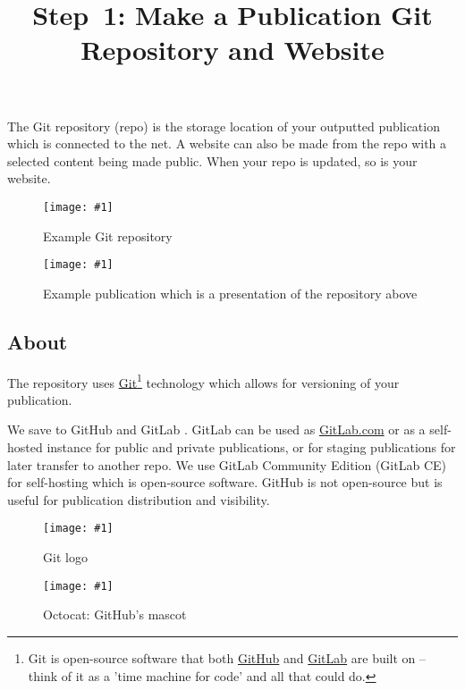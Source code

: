 \documentclass{article}
\newlength{\imgwidth}
\newcommand\scaledgraphics[2]{%
                
\settowidth{\imgwidth}{\texttt{[image: \#1]}}%
                
\setlength{\imgwidth}{\minof{\imgwidth}{#2\textwidth}}%
                
\texttt{[image: \#1]}%
                
}
\begin{document}
\title{Step 1: Make a Publication Git Repository and Website}

\maketitle


The Git repository (repo) is the storage location of your outputted publication which is connected to the net. A website can also be made from the repo with a selected content being made public. When your repo is updated, so is your website.

\begin{figure}
\scaledgraphics{f8bbd94d-f20e-4bbe-b9d3-9b043bedfdb7.png}{0.5}
\caption*{Example Git repository}\label{F55869431}
\end{figure}

\begin{figure}
\scaledgraphics{d7cbcac6-ef5e-484d-850a-d174a6888644.png}{0.5}
\caption*{Example publication which is a presentation of the repository above}\label{F88093361}
\end{figure}


\subsection{About}\label{H4018151}



The repository uses \href{https://git-scm.com/}{Git}\footnote{Git is open-source software that both \href{https://github.com/}{GitHub} and \href{https://about.gitlab.com/}{GitLab} are built on – think of it as a 'time machine for code' and all that could do.} technology which allows for versioning of your publication. 


We save to GitHub and GitLab \autocite{PerkelJeffrey2016}. GitLab can be used as \href{GitLab.com}{GitLab.com} or as a self-hosted instance for public and private publications, or for staging publications for later transfer to another repo. We use GitLab Community Edition (GitLab CE) for self-hosting which is open-source software. GitHub is not open-source but is useful for publication distribution and visibility.

\begin{figure}
\scaledgraphics{26972b81-3aa5-42db-9da6-7ab6ab269dc3.jpg}{0.5}
\caption*{Git logo}\label{F22345641}
\end{figure}

\begin{figure}
\scaledgraphics{db781e4a-0460-4824-8351-05102a800d4e.jpg}{0.5}
\caption*{Octocat: GitHub's mascot}\label{F44428261}
\end{figure}
\end{document}
